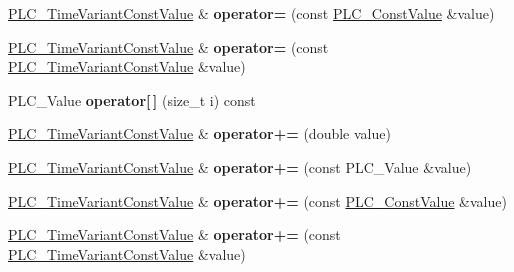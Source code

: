\begin{DoxyCompactItemize}
\item 
\hypertarget{classns3_1_1PLC__TimeVariantConstValue_a4b93ad465886da75139a92dc9d7e028f}{\hyperlink{classns3_1_1PLC__TimeVariantConstValue}{\-P\-L\-C\-\_\-\-Time\-Variant\-Const\-Value} \& {\bfseries operator=} (const \hyperlink{classns3_1_1PLC__ConstValue}{\-P\-L\-C\-\_\-\-Const\-Value} \&value)}\label{classns3_1_1PLC__TimeVariantConstValue_a4b93ad465886da75139a92dc9d7e028f}

\item 
\hypertarget{classns3_1_1PLC__TimeVariantConstValue_a61ff346c044d436c932cc86843e35178}{\hyperlink{classns3_1_1PLC__TimeVariantConstValue}{\-P\-L\-C\-\_\-\-Time\-Variant\-Const\-Value} \& {\bfseries operator=} (const \hyperlink{classns3_1_1PLC__TimeVariantConstValue}{\-P\-L\-C\-\_\-\-Time\-Variant\-Const\-Value} \&value)}\label{classns3_1_1PLC__TimeVariantConstValue_a61ff346c044d436c932cc86843e35178}

\item 
\hypertarget{classns3_1_1PLC__TimeVariantConstValue_a35bbff015864cb4bfd699a1f228893d4}{\-P\-L\-C\-\_\-\-Value {\bfseries operator\mbox{[}$\,$\mbox{]}} (size\-\_\-t i) const }\label{classns3_1_1PLC__TimeVariantConstValue_a35bbff015864cb4bfd699a1f228893d4}

\item 
\hypertarget{classns3_1_1PLC__TimeVariantConstValue_a79d5b13b096013e9fc4903b44b74f8c0}{\hyperlink{classns3_1_1PLC__TimeVariantConstValue}{\-P\-L\-C\-\_\-\-Time\-Variant\-Const\-Value} \& {\bfseries operator+=} (double value)}\label{classns3_1_1PLC__TimeVariantConstValue_a79d5b13b096013e9fc4903b44b74f8c0}

\item 
\hypertarget{classns3_1_1PLC__TimeVariantConstValue_a9d784be04ef6b6e3766ba8a47b1e609f}{\hyperlink{classns3_1_1PLC__TimeVariantConstValue}{\-P\-L\-C\-\_\-\-Time\-Variant\-Const\-Value} \& {\bfseries operator+=} (const \-P\-L\-C\-\_\-\-Value \&value)}\label{classns3_1_1PLC__TimeVariantConstValue_a9d784be04ef6b6e3766ba8a47b1e609f}

\item 
\hypertarget{classns3_1_1PLC__TimeVariantConstValue_abe758bab10edca53b2eb593a9382d0f9}{\hyperlink{classns3_1_1PLC__TimeVariantConstValue}{\-P\-L\-C\-\_\-\-Time\-Variant\-Const\-Value} \& {\bfseries operator+=} (const \hyperlink{classns3_1_1PLC__ConstValue}{\-P\-L\-C\-\_\-\-Const\-Value} \&value)}\label{classns3_1_1PLC__TimeVariantConstValue_abe758bab10edca53b2eb593a9382d0f9}

\item 
\hypertarget{classns3_1_1PLC__TimeVariantConstValue_a979361be3c51a058579789da51811a7c}{\hyperlink{classns3_1_1PLC__TimeVariantConstValue}{\-P\-L\-C\-\_\-\-Time\-Variant\-Const\-Value} \& {\bfseries operator+=} (const \hyperlink{classns3_1_1PLC__TimeVariantConstValue}{\-P\-L\-C\-\_\-\-Time\-Variant\-Const\-Value} \&value)}\label{classns3_1_1PLC__TimeVariantConstValue_a979361be3c51a058579789da51811a7c}


\end{DoxyCompactItemize}

